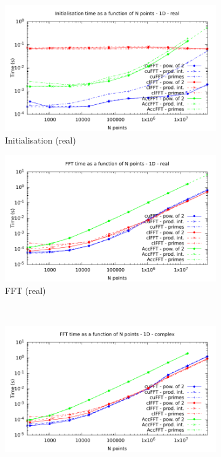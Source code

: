 \documentclass[12pt, a4paper]{article}
\begin{document}
\begin{figure}[htb]
\captionsetup{width=0.8\linewidth}
\centering
\begin{subfigure}{.5\textwidth}
\centering
\includegraphics[width=.9\linewidth]{graphs/fft-1d-r-init.pdf}
\caption{Initialisation (real)}
\label{FFT1DRI}
\end{subfigure}%
\begin{subfigure}{.5\textwidth}
\centering
\includegraphics[width=.9\linewidth]{graphs/fft-1d-r-exec.pdf}
\caption{FFT (real)}
\label{FFT1DRE}
\end{subfigure}\\
\begin{subfigure}{.5\textwidth}
\centering
\includegraphics[width=.9\linewidth]{graphs/fft-1d-c-exec.pdf}

\end{subfigure}
\end{figure}
\end{document}
